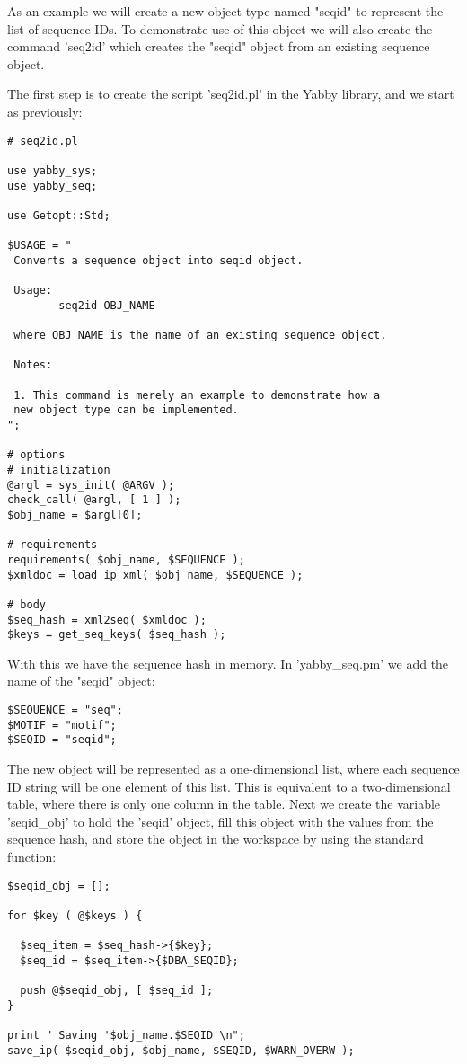 As an example we will create a new object type named "seqid" to
represent the list of sequence IDs. To demonstrate use of this
object we will also create the command 'seq2id' which creates the
"seqid" object from an existing sequence object.

The first step is to create the script 'seq2id.pl' in the Yabby
library, and we start as previously:

\begin{verbatim}
# seq2id.pl

use yabby_sys;
use yabby_seq;

use Getopt::Std;

$USAGE = "
 Converts a sequence object into seqid object.

 Usage:
        seq2id OBJ_NAME

 where OBJ_NAME is the name of an existing sequence object.

 Notes:

 1. This command is merely an example to demonstrate how a
 new object type can be implemented.
";

# options
# initialization
@argl = sys_init( @ARGV );
check_call( @argl, [ 1 ] );
$obj_name = $argl[0];

# requirements
requirements( $obj_name, $SEQUENCE );
$xmldoc = load_ip_xml( $obj_name, $SEQUENCE );

# body
$seq_hash = xml2seq( $xmldoc );
$keys = get_seq_keys( $seq_hash );
\end{verbatim}

With this we have the sequence hash in memory. In 'yabby\_seq.pm' we
add the name of the "seqid" object:

\begin{verbatim}
$SEQUENCE = "seq";
$MOTIF = "motif";
$SEQID = "seqid";
\end{verbatim}

The new object will be represented as a one-dimensional list, where
each sequence ID string will be one element of this list. This is
equivalent to a two-dimensional table, where there is only one
column in the table. Next we create the variable 'seqid\_obj' to
hold the 'seqid' object, fill this object with the values from
the sequence hash, and store the object in the workspace by using
the standard function:

\begin{verbatim}
$seqid_obj = [];

for $key ( @$keys ) {

  $seq_item = $seq_hash->{$key};
  $seq_id = $seq_item->{$DBA_SEQID};

  push @$seqid_obj, [ $seq_id ];
}

print " Saving '$obj_name.$SEQID'\n";
save_ip( $seqid_obj, $obj_name, $SEQID, $WARN_OVERW );
\end{verbatim}

